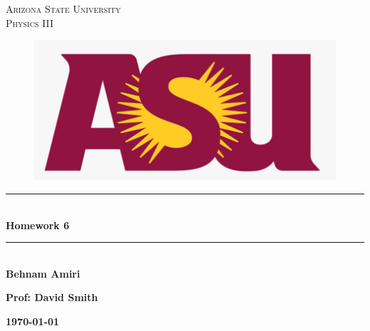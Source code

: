 \documentclass[fleqn]{article}
\begin{document}
  \begin{titlepage}

    \newcommand{\HRule}{\rule{\linewidth}{0.5mm}} %

    \center %
    


    \textsc{\LARGE Arizona State University}\\[1.5cm] %

    \textsc{\LARGE Physics III }\\[1.5cm] %


    \begin{figure}
      \includegraphics[width=\linewidth]{asu.png}
    \end{figure}


    \HRule \\[0.4cm]
    { \huge \bfseries Homework 6}\\[0.4cm] 
    \HRule \\[1.5cm]
    
    \textbf{Behnam Amiri}

    \bigbreak

    \textbf{Prof: David Smith}

    \bigbreak


    \textbf{{\large \today}\\[2cm]}

    \vfill %

  \end{titlepage}
\end{document}
